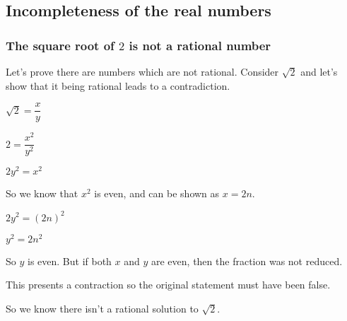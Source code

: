 
\subsection{Incompleteness of the real numbers}

\subsubsection{The square root of \(2\) is not a rational number}

Let's prove there are numbers which are not rational. Consider \(\sqrt 2\) and let's show that it being rational leads to a contradiction.

\(\sqrt 2=\dfrac{x}{y}\)

\(2=\dfrac{x^2}{y^2}\)

\(2y^2=x^2\)

So we know that \(x^2\) is even, and can be shown as \(x=2n\).

\(2y^2=(2n)^2\)

\(y^2=2n^2\)

So \(y\) is even. But if both \(x\) and \(y\) are even, then the fraction was not reduced.

This presents a contraction so the original statement must have been false.

So we know there isn't a rational solution to \(\sqrt 2\).

